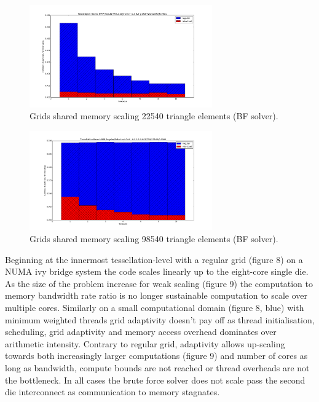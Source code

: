 \documentclass[times,12pt]{article}
\begin{document}
\begin{figure}[htb]
  \begin{center}
    \includegraphics[width=0.7\textwidth]{experiments/omp/omp_mesh_regular-reluctant_20.png}
  \end{center}
  \caption{Grids shared memory scaling 22540 triangle elements (BF solver).}
  \label{figure:omp_regular_reluctant_triangle_209}
\end{figure}

\begin{figure}[htb]
  \begin{center}
    \includegraphics[width=0.7\textwidth]{experiments/omp/omp_mesh_regular-reluctant_200.png}
  \end{center}
  \caption{Grids shared memory scaling 98540 triangle elements (BF solver).}
  \label{figure:omp_regular_reluctant_triangle_2009}
\end{figure}


Beginning at the innermost tessellation-level with a regular grid (figure 8) on a NUMA ivy bridge system the code scales linearly up to the eight-core single die. As the size of the problem increase for weak scaling (figure 9) the computation to memory bandwidth rate ratio is no longer sustainable computation to scale over multiple cores. Similarly on a small computational domain (figure 8, blue) with minimum weighted threads grid adaptivity doesn't pay off as thread initialisation, scheduling, grid adaptivity and memory access overhead dominates over arithmetic intensity. Contrary to regular grid, adaptivity allows up-scaling towards both increasingly larger computations (figure 9) and number of cores as long as bandwidth, compute bounds are not reached or thread overheads are not the bottleneck. In all cases the brute force solver does not scale pass the second die interconnect as communication to memory stagnates.
\end{document}
